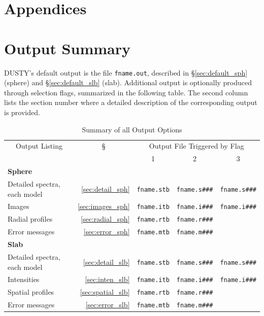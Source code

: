 \documentclass[11pt]{article}
\def\D    {{\sf DUSTY}}
\begin{document}
\begin{appendix}
  \section*{\sc Appendices}


  \section{Output Summary}
  \label{summary}

  \D's default output is the file {\tt fname.out}, described in
  \S\ref{sec:default_sph} (sphere) and \S\ref{sec:default_slb}
  (slab). Additional output is optionally produced through selection
  flags, summarized in the following table.  The second column lists
  the section number where a detailed description of the corresponding
  output is provided.

  \begin{table}[htbp]
    \begin{center}
      \renewcommand{\arraystretch}{1.3}

\caption{\hfil Summary of all Output Options}\label{Options Table}
\centerline{} \renewcommand{\arraystretch}{1.3}
\begin{tabular}{|l|r||c|c|c|} \hline \multicolumn{1}{|c|}{Output
    Listing} & \multicolumn{1}{c||}{\S} & \multicolumn{3}{|c|}{Output
    File Triggered by Flag} \\ \cline{3-5} & & 1 & 2 & 3 \\ \hline
  {\bf Sphere} & & & &\\
  \hline
  Detailed spectra, each model     & \ref{sec:detail_sph} & {\tt fname.stb} & {\tt fname.s\#\#\#} & {\tt fname.s\#\#\#} \\
  \hline
  Images                           & \ref{sec:images_sph} & {\tt fname.itb} & {\tt fname.i\#\#\#} & {\tt fname.i\#\#\#} \\
  \hline
  Radial profiles                  & \ref{sec:radial_sph} & {\tt fname.rtb} & {\tt fname.r\#\#\#} &  \\
  \hline
  Error messages                   & \ref{sec:error_sph} & {\tt fname.mtb} & {\tt fname.m\#\#\#} &  \\
  \hline
  {\bf Slab} & & & &\\
  \hline
  Detailed spectra, each model     & \ref{sec:detail_slb} & {\tt fname.stb} & {\tt fname.s\#\#\#} & {\tt fname.s\#\#\#} \\
  \hline
  Intensities                      & \ref{sec:inten_slb}  & {\tt fname.itb} & {\tt fname.i\#\#\#} & {\tt fname.i\#\#\#} \\
  \hline
  Spatial profiles                 & \ref{sec:spatial_slb} & {\tt fname.rtb} & {\tt fname.r\#\#\#} &  \\
  \hline
  Error messages                   & \ref{sec:error_slb}  & {\tt fname.mtb} & {\tt fname.m\#\#\#} &  \\
  \hline
\end{tabular}
\end{center}
\end{table}



\end{appendix}
\end{document}
